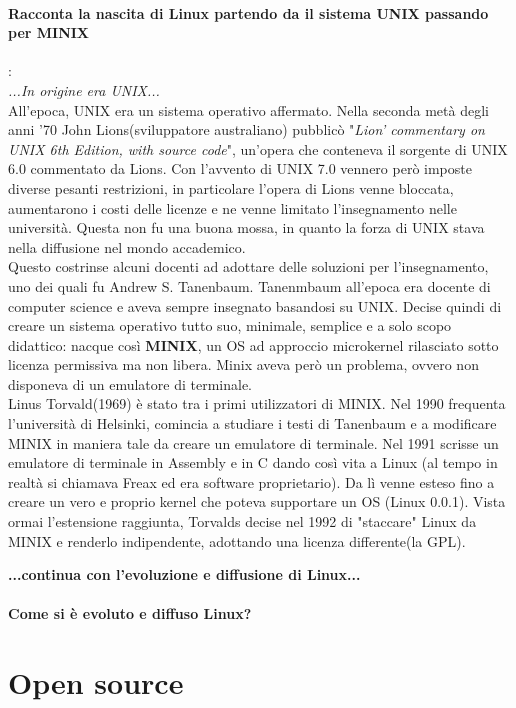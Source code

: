 \documentclass[a4paper]{article}
\begin{document}
		\paragraph{Racconta la nascita di Linux partendo da il sistema UNIX passando per MINIX}: \\
		\textit{...In origine era UNIX...}\\
		All'epoca, UNIX era un sistema operativo affermato. Nella seconda metà degli anni '70 John Lions(sviluppatore australiano) pubblicò "\textit{Lion' commentary on UNIX 6th Edition, with source code}", un'opera che conteneva il sorgente di UNIX 6.0 commentato da Lions. Con l'avvento di UNIX 7.0 vennero però imposte diverse pesanti restrizioni, in particolare l'opera di Lions venne bloccata, aumentarono i costi delle licenze e ne venne limitato l'insegnamento nelle università. Questa non fu una buona mossa, in quanto la forza di UNIX stava nella diffusione nel mondo accademico.\\
		Questo costrinse alcuni docenti ad adottare delle soluzioni per l'insegnamento, uno dei quali fu Andrew S. Tanenbaum.
		Tanenmbaum all'epoca era docente di computer science e aveva sempre insegnato basandosi su UNIX. Decise quindi di creare un sistema operativo tutto suo,  minimale, semplice e a solo scopo didattico: nacque così \textbf{MINIX}, un OS ad approccio microkernel rilasciato sotto licenza permissiva ma non libera.
		Minix aveva però un problema, ovvero non disponeva di un emulatore di terminale.\\
		Linus Torvald(1969) è stato tra i primi utilizzatori di MINIX. Nel 1990 frequenta l'università di Helsinki, comincia a studiare i testi di Tanenbaum e a modificare MINIX in maniera tale da creare un emulatore di terminale. Nel 1991 scrisse un emulatore di terminale in Assembly e in C dando così vita a Linux (al tempo in realtà si chiamava Freax ed era software proprietario). Da lì venne esteso fino a creare un vero e proprio kernel che poteva supportare un OS (Linux 0.0.1). Vista ormai l'estensione raggiunta, Torvalds decise nel 1992 di "staccare" Linux da MINIX e renderlo indipendente, adottando una licenza differente(la GPL).
		
		\textbf{...continua con l'evoluzione e diffusione di Linux...}
		
		
		\paragraph{Come si è evoluto e diffuso Linux?}
	
	
	\section{Open source}
	
\end{document}
